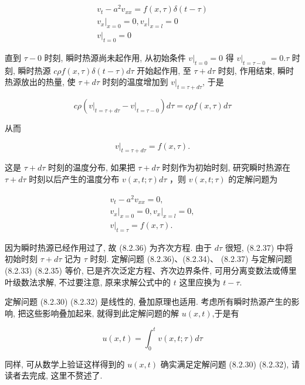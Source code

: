 $$
\begin{gathered}
v_{t}-a^{2} v_{x x}=f(x, \tau) \delta(t-\tau) \\
\left.v_{x}\right|_{x=0}=0,\left.v_{x}\right|_{x=l}=0 \\
\left.v\right|_{t=0}=0
\end{gathered}
$$

直到 $\tau-0$ 时刻, 瞬时热源尚未起作用, 从初始条件 $\left.v\right|_{t=0}=0$ 得 $\left.v\right|_{t=\tau-0}$
$=0 . \tau$ 时刻, 瞬时热源 $c \rho f(x, \tau) \delta(t-\tau) d \tau$ 开始起作用, 至 $\tau+d \tau$ 时刻, 作用结束, 瞬时热源放出的热量, 使 $\tau+d \tau$ 时刻的温度增加到 $\left.v\right|_{t=\tau+d \tau}$, 于是

$$
c \rho\left(\left.v\right|_{t=\tau+d \tau}-\left.v\right|_{t=\tau-0}\right) d \tau=c \rho f(x, \tau) d \tau
$$

从而

$$
\left.v\right|_{t=\tau+d \tau}=f(x, \tau) .
$$

这是 $\tau+d \tau$ 时刻的温度分布, 如果把 $\tau+d \tau$ 时刻作为初始时刻, 研究瞬时热源在 $\tau+d \tau$ 时刻以后产生的温度分布 $v(x, t ; \tau) d \tau$ ，则 $v(x, t ; \tau)$ 的定解问题为

$$
\begin{gathered}
v_{t}-a^{2} v_{x x}=0, \\
\left.v_{x}\right|_{x=0}=0,\left.v_{x}\right|_{x=l}=0, \\
\left.v\right|_{t=\tau}=f(x, \tau) .
\end{gathered}
$$

因为瞬时热源已经作用过了, 故 (8.2.36) 为齐次方程. 由于 $d \tau$ 很短, (8.2.37) 中将初始时刻 $\tau+d \tau$ 记为 $\tau$ 时刻. 定解问题 (8.2.36)、(8.2.34)、 (8.2.37) 与定解问题 (8.2.33) (8.2.35) 等价, 已是齐次泛定方程、齐次边界条件, 可用分离变数法或傅里叶级数法求解, 不过要注意, 原来求解公式中的 $t$ 这里应换为 $t-\tau$.

定解问题 (8.2.30) (8.2.32) 是线性的, 叠加原理也适用. 考虑所有瞬时热源产生的影响, 把这些影响叠加起来, 就得到此定解问题的解 $u(x, t)$,于是有

$$
u(x, t)=\int_{0}^{t} v(x, t ; \tau) d \tau
$$

同样, 可从数学上验证这样得到的 $u(x, t)$ 确实满足定解问题 (8.2.30) (8.2.32), 请读者去完成, 这里不赘述了.